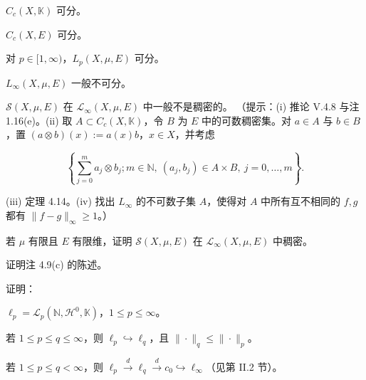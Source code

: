 \begin{exercises}
\begin{subitems}
$ C_c(X,\mathbb{K}) $ 可分。

\item

$ C_c(X,E) $ 可分。

\item

对 $ p \in [1,\infty) $，$ L_p(X,\mu,E) $ 可分。

\item

$ L_\infty(X,\mu,E) $ 一般不可分。

\item

$ \mathcal{S}(X,\mu,E) $ 在 $ \mathcal{L}_\infty(X,\mu,E) $ 中一般不是稠密的。
（提示：(i) 推论 V.4.8 与注 1.16(e)。(ii) 取 $ A \subset C_c(X,\mathbb{K}) $，令 $ B $ 为 $ E $ 中的可数稠密集。对 $ a \in A $ 与 $ b \in B $，置 $ (a\otimes b)(x) := a(x)b $，$ x \in X $，并考虑

\[
\left\{ \sum_{j=0}^{m} a_j \otimes b_j ; m \in \mathbb{N}, \ (a_j,b_j) \in A \times B, \ j = 0,\dots,m \right\} .
\]
\end{subitems}

(iii) 定理 4.14。(iv) 找出 $ L_\infty $ 的不可数子集 $ A $，使得对 $ A $ 中所有互不相同的 $ f,g $ 都有 $ \|f-g\|_\infty \ge 1 $。）

\item

若 $ \mu $ 有限且 $ E $ 有限维，证明 $ \mathcal{S}(X,\mu,E) $ 在 $ \mathcal{L}_\infty(X,\mu,E) $ 中稠密。

\item

证明注 4.9(c) 的陈述。

\item

证明：

\begin{subitems}
\item

$ \ell_p = \mathcal{L}_p(\mathbb{N},\mathcal{H}^0,\mathbb{K}) $，$ 1 \le p \le \infty $。

\item

若 $ 1 \le p \le q \le \infty $，则 $ \ell_p \hookrightarrow \ell_q $，且 $ \|\cdot\|_q \le \|\cdot\|_p $。

\item

若 $ 1 \le p \le q < \infty $，则 $ \ell_p \xrightarrow{d} \ell_q \xrightarrow{d} c_0 \hookrightarrow \ell_\infty $（见第 II.2 节）。


\end{subitems}
\end{exercises}
